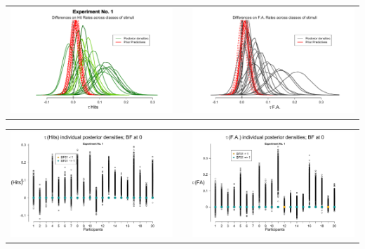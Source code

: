 \documentclass[final]{beamer}
\newlength{\onecolwid}
\newlength{\twocolwid}
\begin{document}
\begin{frame}[t]
\begin{columns}[t]
\begin{column}{\twocolwid}
\begin{columns}[t,totalwidth=\twocolwid]
\begin{column}{\onecolwid}
\begin{alertblock}{}
\begin{center}
\begin{tabular}{ccc}
\includegraphics[width=0.45\linewidth]{Figures/3-Exp1_TauH.pdf}  & \hfill & \includegraphics[width=0.45\linewidth]{Figures/3-Exp1_TauF.pdf}
\end{tabular}
\end{center}

\begin{center}
\begin{tabular}{ccc}
\includegraphics[width=0.45\linewidth]{Figures/3-Exp1_BFH0.pdf}  & \hfill & \includegraphics[width=0.45\linewidth]{Figures/3-Exp1_BFF0.pdf}
\end{tabular}
\end{center}


\end{alertblock}
\end{column}
\end{columns}
\end{column}
\end{columns}
\end{frame}
\end{document}
